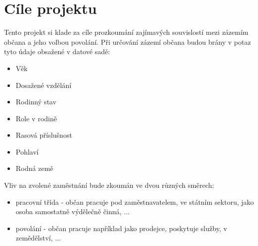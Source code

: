 \documentclass[11pt,a4paper,titlepage]{article}
\begin{document}
    \section{Cíle projektu\label{cile}}
    
    Tento projekt si klade za cíle prozkoumání zajímavých souvislostí mezi zázemím občana a jeho volbou povolání. Při určování zázemí občana budou brány v potaz tyto údaje obsažené v datové sadě:
    
    \begin{itemize}
    	\item Věk
		\item Dosažené vzdělání
		\item Rodinný stav
		\item Role v rodině
		\item Rasová příslušnost
		\item Pohlaví
		\item Rodná země
    \end{itemize}
    
    
	Vliv na zvolené zaměstnání bude zkoumán ve dvou různých směrech:
    \begin{itemize}
        \item pracovní třída - občan pracuje pod zaměstnavatelem, ve státním sektoru, jako osoba samostatně výdělečně činná, ...
        \item povolání - občan pracuje například jako prodejce, poskytuje služby, v zemědělství, ...
    \end{itemize}
\end{document}
